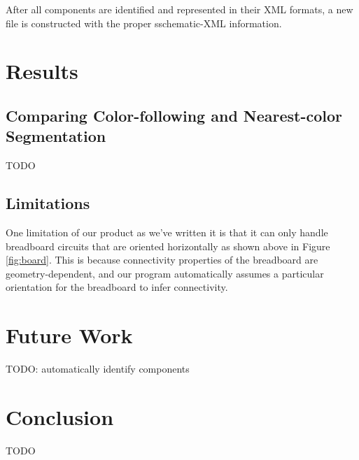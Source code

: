 \documentclass[10pt,twocolumn,letterpaper]{article}
\begin{document}
After all components are identified and represented in their XML formats, a new
file is constructed with the proper sschematic-XML information.    

\section{Results}

\subsection{Comparing Color-following and Nearest-color Segmentation}

TODO

\subsection{Limitations}

One limitation of our product as we've written it is that it can only handle
breadboard circuits that are oriented horizontally as shown above in Figure
\ref{fig:board}. This is because connectivity properties of the breadboard are
geometry-dependent, and our program automatically assumes a particular
orientation for the breadboard to infer connectivity.  

\section{Future Work}

TODO: automatically identify components

\section{Conclusion}

TODO

{\small


}
\end{document}
